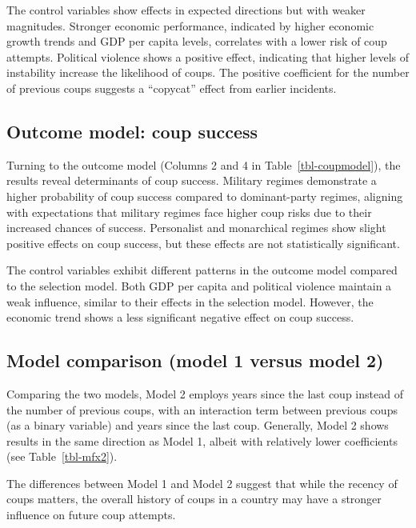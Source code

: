 \documentclass[
  12pt,
]{report}
\begin{document}
The control variables show effects in expected directions but with
weaker magnitudes. Stronger economic performance, indicated by higher
economic growth trends and GDP per capita levels, correlates with a
lower risk of coup attempts. Political violence shows a positive effect,
indicating that higher levels of instability increase the likelihood of
coups. The positive coefficient for the number of previous coups
suggests a ``copycat'' effect from earlier incidents.

\subsection{Outcome model: coup
success}\label{outcome-model-coup-success}

Turning to the outcome model (Columns 2 and 4 in
Table~\ref{tbl-coupmodel}), the results reveal determinants of coup
success. Military regimes demonstrate a higher probability of coup
success compared to dominant-party regimes, aligning with expectations
that military regimes face higher coup risks due to their increased
chances of success. Personalist and monarchical regimes show slight
positive effects on coup success, but these effects are not
statistically significant.

The control variables exhibit different patterns in the outcome model
compared to the selection model. Both GDP per capita and political
violence maintain a weak influence, similar to their effects in the
selection model. However, the economic trend shows a less significant
negative effect on coup success.

\subsection{Model comparison (model 1 versus model
2)}\label{model-comparison-model-1-versus-model-2}

Comparing the two models, Model 2 employs years since the last coup
instead of the number of previous coups, with an interaction term
between previous coups (as a binary variable) and years since the last
coup. Generally, Model 2 shows results in the same direction as Model 1,
albeit with relatively lower coefficients (see Table~\ref{tbl-mfx2}).

The differences between Model 1 and Model 2 suggest that while the
recency of coups matters, the overall history of coups in a country may
have a stronger influence on future coup attempts.
\end{document}
